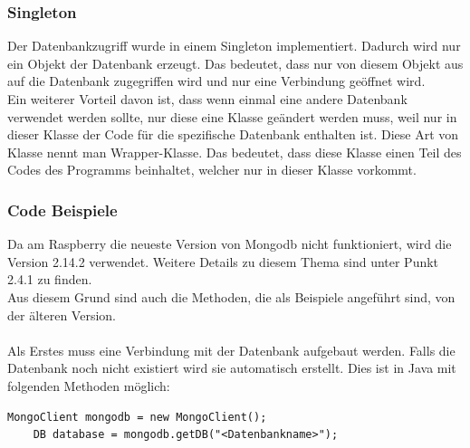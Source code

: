 \subsubsection{Singleton}
Der Datenbankzugriff wurde in einem Singleton implementiert. Dadurch wird nur ein Objekt der Datenbank erzeugt. Das bedeutet, dass nur von diesem Objekt aus auf die Datenbank zugegriffen wird und nur eine Verbindung geöffnet wird.
\\ Ein weiterer Vorteil davon ist, dass wenn einmal eine andere Datenbank verwendet werden sollte, nur diese eine Klasse geändert werden muss, weil nur in dieser Klasse der Code für die spezifische Datenbank enthalten ist. Diese Art von Klasse nennt man Wrapper-Klasse. Das bedeutet, dass diese Klasse einen Teil des Codes des Programms beinhaltet, welcher nur in dieser Klasse vorkommt.

\subsubsection{Code Beispiele}
Da am Raspberry die neueste Version von Mongodb nicht funktioniert, wird die Version 2.14.2 verwendet. Weitere Details zu diesem Thema sind unter Punkt 2.4.1 zu finden.
\\ Aus diesem Grund sind auch die Methoden, die als Beispiele angeführt sind, von der älteren Version. 
\\ \\ 
Als Erstes muss eine Verbindung mit der Datenbank aufgebaut werden. Falls die Datenbank noch nicht existiert wird sie automatisch erstellt.
Dies ist in Java mit folgenden Methoden möglich:
\begin{lstlisting}[style=JavaStyle, caption=Mit Mongodb verbinden]
	MongoClient mongodb = new MongoClient();
	DB database = mongodb.getDB("<Datenbankname>");
\end{lstlisting}

